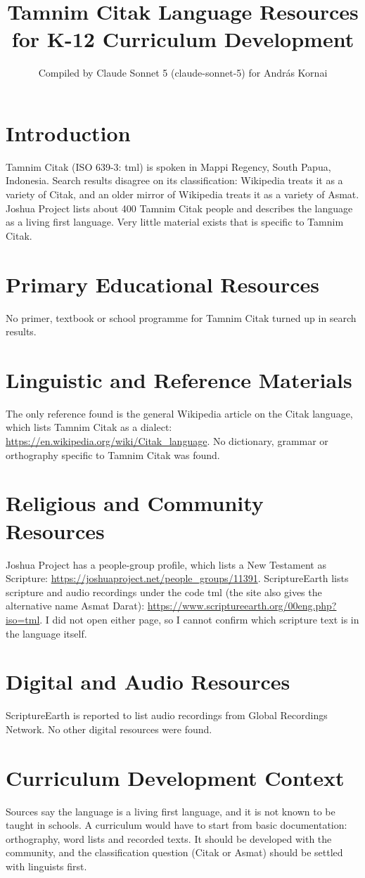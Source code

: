 \documentclass[12pt]{article}
\title{Tamnim Citak Language Resources for K-12 Curriculum Development}
\author{Compiled by Claude Sonnet 5 (claude-sonnet-5) for Andr\'as Kornai}
\date{}
\begin{document}
\maketitle

\section{Introduction}
Tamnim Citak (ISO 639-3: tml) is spoken in Mappi Regency, South Papua, Indonesia. Search results disagree on its classification: Wikipedia treats it as a variety of Citak, and an older mirror of Wikipedia treats it as a variety of Asmat. Joshua Project lists about 400 Tamnim Citak people and describes the language as a living first language. Very little material exists that is specific to Tamnim Citak.

\section{Primary Educational Resources}
No primer, textbook or school programme for Tamnim Citak turned up in search results.

\section{Linguistic and Reference Materials}
The only reference found is the general Wikipedia article on the Citak language, which lists Tamnim Citak as a dialect: \url{https://en.wikipedia.org/wiki/Citak_language}. No dictionary, grammar or orthography specific to Tamnim Citak was found.

\section{Religious and Community Resources}
Joshua Project has a people-group profile, which lists a New Testament as Scripture: \url{https://joshuaproject.net/people_groups/11391}. ScriptureEarth lists scripture and audio recordings under the code tml (the site also gives the alternative name Asmat Darat): \url{https://www.scriptureearth.org/00eng.php?iso=tml}. I did not open either page, so I cannot confirm which scripture text is in the language itself.

\section{Digital and Audio Resources}
ScriptureEarth is reported to list audio recordings from Global Recordings Network. No other digital resources were found.

\section{Curriculum Development Context}
Sources say the language is a living first language, and it is not known to be taught in schools. A curriculum would have to start from basic documentation: orthography, word lists and recorded texts. It should be developed with the community, and the classification question (Citak or Asmat) should be settled with linguists first.
\end{document}
